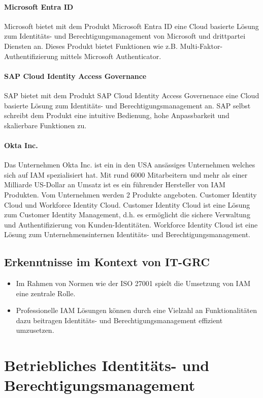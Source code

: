 \documentclass[11pt]{article}
\begin{document}
\paragraph{Microsoft Entra ID}
Microsoft bietet mit dem Produkt \glqq{}Microsoft Entra ID\grqq{} eine Cloud basierte Lösung zum Identitäts- und Berechtigungsmanagement von Microsoft und drittpartei Diensten an. Dieses Produkt bietet Funktionen wie z.B. Multi-Faktor-Authentifizierung mittels Microsoft Authenticator.
\paragraph{SAP Cloud Identity Access Governance}
SAP bietet mit dem Produkt \glqq{}SAP Cloud Identity Access Governenace\grqq{} eine Cloud basierte Lösung zum Identitäts- und Berechtigungsmanagement an. SAP selbst schreibt dem Produkt eine intuitive Bedienung, hohe Anpassbarkeit und skalierbare Funktionen zu.
\paragraph{Okta Inc.}
Das Unternehmen Okta Inc. ist ein in den USA ansässiges Unternehmen welches sich auf IAM spezialisiert hat. Mit rund 6000 Mitarbeitern und mehr als einer Milliarde US-Dollar an Umsatz ist es ein führender Hersteller von IAM Produkten. Vom Unternehmen werden 2 Produkte angeboten. Customer Identity Cloud und Workforce Identity Cloud. Customer Identity Cloud ist eine Lösung zum Customer Identity Management, d.h. es ermöglicht die sichere Verwaltung und Authentifizierung von Kunden-Identitäten. Workforce Identity Cloud ist eine Lösung zum Unternehmensinternen Identitäts- und Berechtigungsmanagement.
\subsection{Erkenntnisse im Kontext von IT-GRC}
\begin{itemize}
  \item Im Rahmen von Normen wie der ISO 27001 spielt die Umsetzung von IAM eine zentrale Rolle.
  \item Professionelle IAM Lösungen können durch eine Vielzahl an Funktionalitäten dazu beitragen Identitäts- und Berechtigungsmanagement effizient umzusetzen.
\end{itemize}
\section{Betriebliches Identitäts- und Berechtigungsmanagement}
\label{sec:betrieb}
\end{document}
